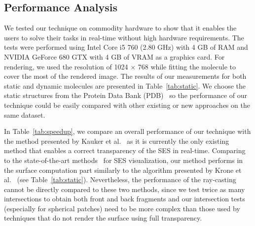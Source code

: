 \subsection{Performance Analysis}
\label{sec:performance}

We tested our technique on commodity hardware to show that it enables the users to solve their tasks in real-time without high hardware requirements.
The tests were performed using Intel Core i5 760 (2.80 GHz) with 4 GB of RAM and NVIDIA GeForce 680 GTX with 4 GB of VRAM as a graphics card.
For rendering, we used the resolution of 1024 $\times$ 768 while fitting the molecule to cover the most of the rendered image.
The results of our measurements for both static and dynamic molecules are presented in Table~\ref{tab:static}.
We choose the static structures from the Protein Data Bank (PDB)~\cite{sussman1998protein} so the performance of our technique could be easily compared with other existing or new approaches on the same dataset.

In Table~\ref{tab:speedup}, we compare an overall performance of our technique with the method presented by Kauker et al.~\cite{kauker2013rendering} as it is currently the only existing method that enables a correct transparency of the SES in real-time.
Comparing to the state-of-the-art methods~\cite{lindow2010accelerated,krone2011parallel} for SES visualization, our method performs in the surface computation part similarly to the algorithm presented by Krone et al.~\cite{krone2011parallel} (see Table~\ref{tab:static}).
Nevertheless, the performance of the ray-casting cannot be directly compared to these two methods, since
we test twice as many intersections to obtain both front and back fragments and our intersection tests (especially for spherical patches) need to be more complex than those used by techniques that do not render the surface using full transparency.


\setlength{\tabcolsep}{4.5pt}


